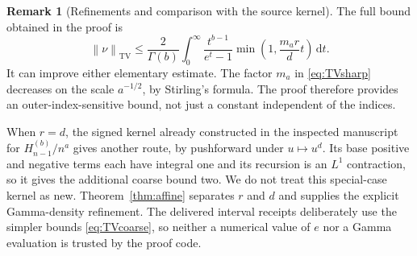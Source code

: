 \documentclass[11pt,letterpaper]{article}
\numberwithin{equation}{section}
\theoremstyle{definition}
\newtheorem{remark}[theorem]{Remark}
\DeclareMathOperator{\TV}{TV}
\newcommand{\dd}{\,\mathrm d}
\newcommand{\norm}[1]{\left\lVert#1\right\rVert}
\begin{document}
\begin{remark}[Refinements and comparison with the source kernel]
The full bound obtained in the proof is
\begin{equation}
 \norm\nu_{\TV}\le\frac2{\Gamma(b)}\int_0^\infty
 \frac{t^{b-1}}{e^t-1}\min\left(1,\frac{m_ar}{d}t\right)\dd t.
 \label{eq:TVmin}
\end{equation}
It can improve either elementary estimate. The factor $m_a$ in
\eqref{eq:TVsharp} decreases on the scale $a^{-1/2}$, by Stirling's
formula. The proof therefore provides an outer-index-sensitive bound,
not just a constant independent of the indices.

When $r=d$, the signed kernel already constructed in the inspected
manuscript for $H_{n-1}^{(b)}/n^a$ gives another route, by pushforward
under $u\mapsto u^d$. Its base positive and negative terms each have
integral one and its recursion is an $L^1$ contraction, so it gives
the additional coarse bound two. We do not treat this special-case
kernel as new. Theorem~\ref{thm:affine} separates $r$ and $d$ and
supplies the explicit Gamma-density refinement. The delivered interval
receipts deliberately use the simpler bounds \eqref{eq:TVcoarse}, so
neither a numerical value of $e$ nor a Gamma evaluation is trusted by
the proof code.
\end{remark}
\end{document}
